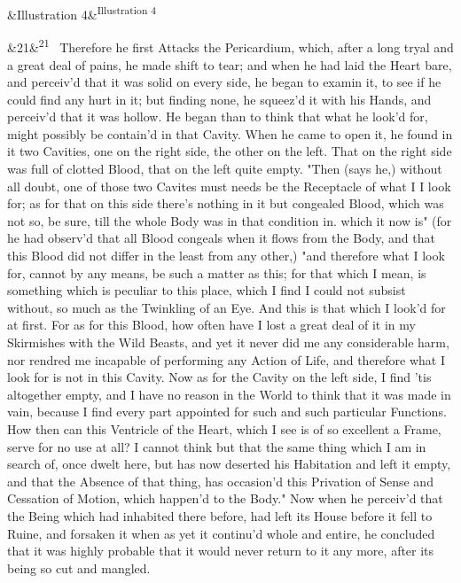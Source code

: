 \documentclass[12pt]{article}
\newcommand{\para}[1][]{\par\noindent\ifx&#1&\else\textsuperscript{\footnotesize #1}~\fi}
\begin{document}
\para [Illustration 4]

\para[21] Therefore he first Attacks the Pericardium, which, after a long tryal and a great deal of pains, he made shift to tear; and when he had laid the Heart bare, and perceiv'd that it was solid on every side, he began to examin it, to see if he could find any hurt in it; but finding none, he squeez'd it with his Hands, and perceiv'd that it was hollow. He began than to think that what he look'd for, might possibly be contain'd in that Cavity. When he came to open it, he found in it two Cavities, one on the right side, the other on the left. That on the right side was full of clotted Blood, that on the left quite empty. "Then (says he,) without all doubt, one of those two Cavites must needs be the Receptacle of what I I look for; as for that on this side there's nothing in it but congealed Blood, which was not so, be sure, till the whole Body was in that condition in. which it now is" (for he had observ'd that all Blood congeals when it flows from the Body, and that this Blood did not differ in the least from any other,) "and therefore what I look for, cannot by any means, be such a matter as this; for that which I mean, is something which is peculiar to this place, which I find I could not subsist without, so much as the Twinkling of an Eye. And this is that which I look'd for at first. For as for this Blood, how often have I lost a great deal of it in my Skirmishes with the Wild Beasts, and yet it never did me any considerable harm, nor rendred me incapable of performing any Action of Life, and therefore what I look for is not in this Cavity. Now as for the Cavity on the left side, I find 'tis altogether empty, and I have no reason in the World to think that it was made in vain, because I find every part appointed for such and such particular Functions. How then can this Ventricle of the Heart, which I see is of so excellent a Frame, serve for no use at all? I cannot think but that the same thing which I am in search of, once dwelt here, but has now deserted his Habitation and left it empty, and that the Absence of that thing, has occasion'd this Privation of Sense and Cessation of Motion, which happen'd to the Body." Now when he perceiv'd that the Being which had inhabited there before, had left its House before it fell to Ruine, and forsaken it when as yet it continu'd whole and entire, he concluded that it was highly probable that it would never return to it any more, after its being so cut and mangled.
\end{document}
